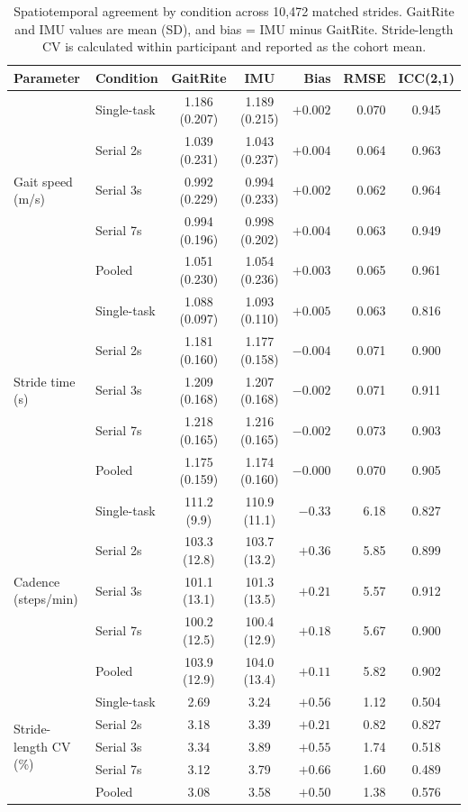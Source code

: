 \documentclass[fleqn,10pt,lineno]{wlpeerj}
\begin{document}
\begin{table}[!ht]
\centering
\caption{Spatiotemporal agreement by condition across 10{,}472 matched strides. GaitRite and IMU values are mean (SD), and bias = IMU minus GaitRite. Stride-length CV is calculated within participant and reported as the cohort mean.}
\label{tab:spatiotemporal}
\small
\begin{tabular}{@{}llccrrc@{}}
\toprule
Parameter & Condition & GaitRite & IMU & Bias & RMSE & ICC(2,1) \\
\midrule
\multirow{5}{*}{Gait speed (m/s)}
 & Single-task & 1.186 (0.207) & 1.189 (0.215) & $+0.002$ & 0.070 & 0.945 \\
 & Serial 2s   & 1.039 (0.231) & 1.043 (0.237) & $+0.004$ & 0.064 & 0.963 \\
 & Serial 3s   & 0.992 (0.229) & 0.994 (0.233) & $+0.002$ & 0.062 & 0.964 \\
 & Serial 7s   & 0.994 (0.196) & 0.998 (0.202) & $+0.004$ & 0.063 & 0.949 \\
 & Pooled      & 1.051 (0.230) & 1.054 (0.236) & $+0.003$ & 0.065 & 0.961 \\
\midrule
\multirow{5}{*}{Stride time (s)}
 & Single-task & 1.088 (0.097) & 1.093 (0.110) & $+0.005$ & 0.063 & 0.816 \\
 & Serial 2s   & 1.181 (0.160) & 1.177 (0.158) & $-0.004$ & 0.071 & 0.900 \\
 & Serial 3s   & 1.209 (0.168) & 1.207 (0.168) & $-0.002$ & 0.071 & 0.911 \\
 & Serial 7s   & 1.218 (0.165) & 1.216 (0.165) & $-0.002$ & 0.073 & 0.903 \\
 & Pooled      & 1.175 (0.159) & 1.174 (0.160) & $-0.000$ & 0.070 & 0.905 \\
\midrule
\multirow{5}{*}{Cadence (steps/min)}
 & Single-task & 111.2 (9.9) & 110.9 (11.1) & $-0.33$ & 6.18 & 0.827 \\
 & Serial 2s   & 103.3 (12.8) & 103.7 (13.2) & $+0.36$ & 5.85 & 0.899 \\
 & Serial 3s   & 101.1 (13.1) & 101.3 (13.5) & $+0.21$ & 5.57 & 0.912 \\
 & Serial 7s   & 100.2 (12.5) & 100.4 (12.9) & $+0.18$ & 5.67 & 0.900 \\
 & Pooled      & 103.9 (12.9) & 104.0 (13.4) & $+0.11$ & 5.82 & 0.902 \\
\midrule
\multirow{5}{*}{Stride-length CV (\%)}
 & Single-task & 2.69 & 3.24 & $+0.56$ & 1.12 & 0.504 \\
 & Serial 2s   & 3.18 & 3.39 & $+0.21$ & 0.82 & 0.827 \\
 & Serial 3s   & 3.34 & 3.89 & $+0.55$ & 1.74 & 0.518 \\
 & Serial 7s   & 3.12 & 3.79 & $+0.66$ & 1.60 & 0.489 \\
 & Pooled      & 3.08 & 3.58 & $+0.50$ & 1.38 & 0.576 \\
\bottomrule
\end{tabular}
\end{table}
\end{document}
